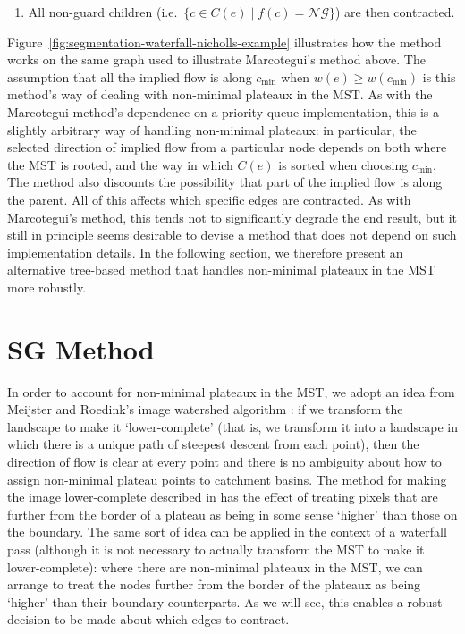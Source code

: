 \documentclass[preprint,a4paper]{elsarticle}
\begin{document}
\begin{enumerate}
\begin{enumerate}
\item All non-guard children (i.e.~$\{c \in C(e) \; | \; f(c) = \mathcal{NG}\}$) are then contracted.

\end{enumerate}

\end{enumerate}
%
Figure~\ref{fig:segmentation-waterfall-nicholls-example} illustrates how the method works on the same graph used to illustrate Marcotegui's method above. The assumption that all the implied flow is along $c_{\min}$ when $w(e) \ge w(c_{\min})$ is this method's way of dealing with non-minimal plateaux in the MST. As with the Marcotegui method's dependence on a priority queue implementation, this is a slightly arbitrary way of handling non-minimal plateaux: in particular, the selected direction of implied flow from a particular node depends on both where the MST is rooted, and the way in which $C(e)$ is sorted when choosing $c_{\min}$. The method also discounts the possibility that part of the implied flow is along the parent. All of this affects which specific edges are contracted. As with Marcotegui's method, this tends not to significantly degrade the end result, but it still in principle seems desirable to devise a method that does not depend on such implementation details. In the following section, we therefore present an alternative tree-based method that handles non-minimal plateaux in the MST more robustly.

\section{SG Method}
\label{sec:golodetz}

In order to account for non-minimal plateaux in the MST, we adopt an idea from Meijster and Roedink's image watershed algorithm \cite{meijster98}: if we transform the landscape to make it `lower-complete' (that is, we transform it into a landscape in which there is a unique path of steepest descent from each point), then the direction of flow is clear at every point and there is no ambiguity about how to assign non-minimal plateau points to catchment basins. The method for making the image lower-complete described in \cite{meijster98} has the effect of treating pixels that are further from the border of a plateau as being in some sense `higher' than those on the boundary. The same sort of idea can be applied in the context of a waterfall pass (although it is not necessary to actually transform the MST to make it lower-complete): where there are non-minimal plateaux in the MST, we can arrange to treat the nodes further from the border of the plateaux as being `higher' than their boundary counterparts. As we will see, this enables a robust decision to be made about which edges to contract.
\end{document}

